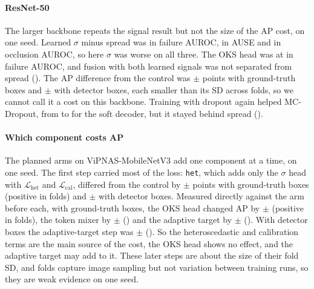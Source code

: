 \documentclass[preprint,11pt]{elsarticle}
\begin{document}
\paragraph{ResNet-50} The larger backbone repeats the signal result but not the size of the AP cost, on
one seed. Learned $\sigma$ minus spread was \DfaFtRFiveZeroFullSZeroHetMinusDist{} in failure AUROC,
\DauseFtRFiveZeroFullSZeroHetMinusDist{} in AUSE and \DoaFtRFiveZeroFullSZeroHetMinusDist{} in occlusion
AUROC, so here $\sigma$ was worse on all three. The OKS head was at
\DfaFtRFiveZeroFullSZeroOksMinusDist{} in failure AUROC, and fusion with both learned signals was not
separated from spread (\DfaFtRFiveZeroFullSZeroFusionMinusDist{}). The AP difference from the control was
\DapGtFtRFiveZeroFullSZero{} $\pm$ \DapSdGtFtRFiveZeroFullSZero{} points with ground-truth boxes and
\DapDetFtRFiveZeroFullSZero{} $\pm$ \DapSdDetFtRFiveZeroFullSZero{} with detector boxes, each smaller than
its SD across folds, so we cannot call it a cost on this backbone. Training with dropout again helped
MC-Dropout, from \FaZsSimccRFiveZeroMcSoft{} to \FaFtRFiveZeroBaseSZeroMcSoft{} for the soft decoder, but
it stayed behind spread (\DfaFtRFiveZeroBaseSZeroMcSoftMinusDist{}).

\paragraph{Which component costs AP} The planned arms on ViPNAS-MobileNetV3 add one component at a time,
on one seed. The first step carried most of the loss: \texttt{het}, which adds only the $\sigma$ head with
$\mathcal{L}_{\text{het}}$ and $\mathcal{L}_{\text{cal}}$, differed from the control by
\DapGtFtMbvThreeHetSZero{} $\pm$ \DapSdGtFtMbvThreeHetSZero{} points with ground-truth boxes (positive in
\DapPosGtFtMbvThreeHetSZero{} folds) and \DapDetFtMbvThreeHetSZero{} $\pm$ \DapSdDetFtMbvThreeHetSZero{}
with detector boxes. Measured directly against the arm before each, with ground-truth boxes, the OKS head
changed AP by \StepGtFtMbvThreeHetOksSZero{} $\pm$ \StepSdGtFtMbvThreeHetOksSZero{} (positive in
\StepPosGtFtMbvThreeHetOksSZero{} folds), the token mixer by \StepGtFtMbvThreeMixSZero{} $\pm$
\StepSdGtFtMbvThreeMixSZero{} (\StepPosGtFtMbvThreeMixSZero{}) and the adaptive target by
\StepGtFtMbvThreeFullSZero{} $\pm$ \StepSdGtFtMbvThreeFullSZero{} (\StepPosGtFtMbvThreeFullSZero{}). With
detector boxes the adaptive-target step was \StepDetFtMbvThreeFullSZero{} $\pm$
\StepSdDetFtMbvThreeFullSZero{} (\StepPosDetFtMbvThreeFullSZero{}). So the heteroscedastic and calibration
terms are the main source of the cost, the OKS head shows no effect, and the adaptive target may add to it.
These later steps are about the size of their fold SD, and folds capture image sampling but not variation
between training runs, so they are weak evidence on one seed.
\end{document}
